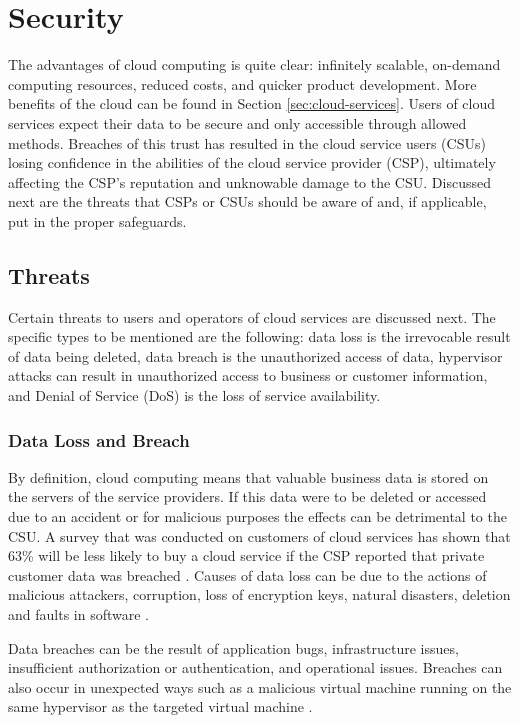 \documentclass[12pt]{article}
\begin{document}
\section{Security} \label{sec:security}

The advantages of cloud computing is quite clear: infinitely scalable, on-demand computing resources, reduced costs, and quicker product development. More benefits of the cloud can be found in Section \ref{sec:cloud-services}. Users of cloud services expect their data to be secure and only accessible through allowed methods. Breaches of this trust has resulted in the cloud service users (CSUs) losing confidence in the abilities of the cloud service provider (CSP), ultimately affecting the CSP's reputation and unknowable damage to the CSU. Discussed next are the threats that CSPs or CSUs should be aware of and, if applicable, put in the proper safeguards.

\subsection{Threats}

Certain threats to users and operators of cloud services are discussed next. The specific types to be mentioned are the following: data loss is the irrevocable result of data being deleted, data breach is the unauthorized access of data, hypervisor attacks can result in unauthorized access to business or customer information, and Denial of Service (DoS) is the loss of service availability.



\subsubsection{Data Loss and Breach}

By definition, cloud computing means that valuable business data is stored on the servers of the service providers. If this data were to be deleted or accessed due to an accident or for malicious purposes the effects can be detrimental to the CSU. A survey that was conducted on customers of cloud services has shown that 63\% will be less likely to buy a cloud service if the CSP reported that private customer data was breached \cite{microsoftdata}. Causes of data loss can be due to the actions of malicious attackers, corruption, loss of encryption keys, natural disasters, deletion and faults in software \cite{kazim2015survey}.

Data breaches can be the result of application bugs, infrastructure issues, insufficient authorization or authentication, and operational issues. Breaches can also occur in unexpected ways such as a malicious virtual machine running on the same hypervisor as the targeted virtual machine \cite{zhang2012cross}.
\end{document}
